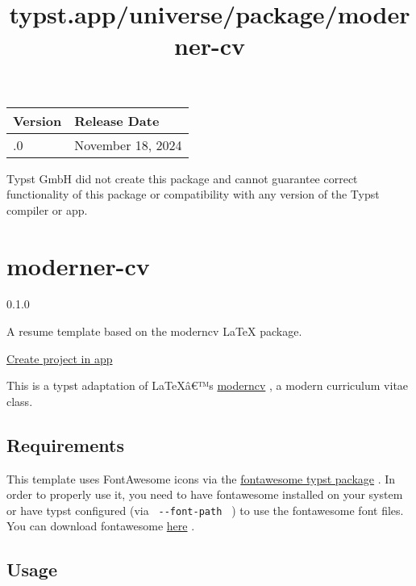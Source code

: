\begin{longtable}[]{@{}ll@{}}
\toprule\noalign{}
Version & Release Date \\
\midrule\noalign{}
\endhead
\bottomrule\noalign{}
\endlastfoot
1.0.0 & November 18, 2024 \\
\end{longtable}

Typst GmbH did not create this package and cannot guarantee correct
functionality of this package or compatibility with any version of the
Typst compiler or app.


\title{typst.app/universe/package/moderner-cv}

\label{banner}
\label{template-thumbnail}

\section{moderner-cv}\label{moderner-cv}

{ 0.1.0 }

A resume template based on the moderncv LaTeX package.

\href{/app?template=moderner-cv&version=0.1.0}{Create project in app}

\label{readme}
This is a typst adaptation of LaTeXâ€™s
\href{https://github.com/moderncv/moderncv}{moderncv} , a modern
curriculum vitae class.

\subsection{Requirements}\label{requirements}

This template uses FontAwesome icons via the
\href{https://typst.app/universe/package/fontawesome}{fontawesome typst
package} . In order to properly use it, you need to have fontawesome
installed on your system or have typst configured (via
\texttt{\ -\/-font-path\ } ) to use the fontawesome font files. You can
download fontawesome \href{https://fontawesome.com/download}{here} .

\subsection{Usage}\label{usage}

\begin{Shaded}
\begin{Highlighting}[]

\NormalTok{  ),}
\NormalTok{)}

\end{Highlighting}
\end{Shaded}

